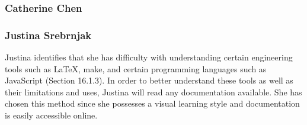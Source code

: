 \documentclass[12pt]{article}
\begin{document}
\subsubsection{Catherine Chen}
\subsubsection{Justina Srebrnjak}
Justina identifies that she has difficulty with understanding certain engineering tools such as \LaTeX, make, and certain programming languages such as JavaScript (Section 16.1.3). In order to better understand these tools as well as their limitations and uses, Justina will read any documentation available. She has chosen this method since she possesses a visual learning style and documentation is easily accessible online.
\end{document}

